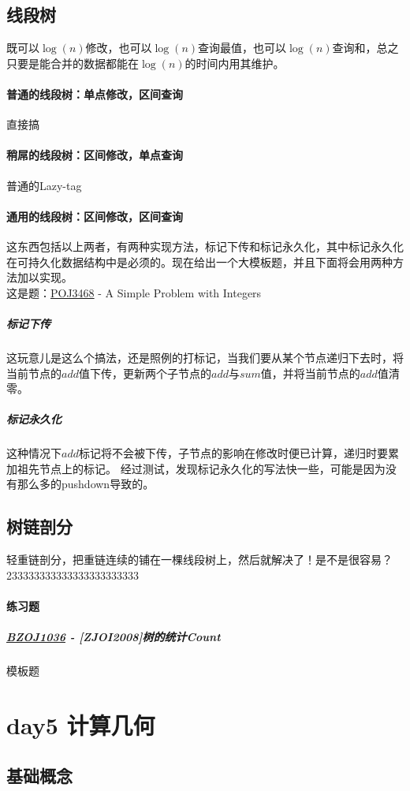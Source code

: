 \documentclass[]{cpp}
\begin{document}
\subsection{线段树} 既可以$\log(n)$修改，也可以$\log(n)$查询最值，也可以$\log(n)$查询和，总之只要是能合并的数据都能在$\log(n)$的时间内用其维护。
\paragraph{普通的线段树：单点修改，区间查询} 直接搞
\paragraph{稍屌的线段树：区间修改，单点查询} 普通的Lazy-tag
\paragraph{通用的线段树：区间修改，区间查询}
	这东西包括以上两者，有两种实现方法，标记下传和标记永久化，其中标记永久化在可持久化数据结构中是必须的。现在给出一个大模板题，并且下面将会用两种方法加以实现。\\
	这是题：\href{http://poj.org/problem?id=3468}{POJ3468} - A Simple Problem with Integers
\subparagraph{标记下传}
	这玩意儿是这么个搞法，还是照例的打标记，当我们要从某个节点递归下去时，将当前节点的$add$值下传，更新两个子节点的$add$与$sum$值，并将当前节点的$add$值清零。
\subparagraph{标记永久化}
	这种情况下$add$标记将不会被下传，子节点的影响在修改时便已计算，递归时要累加祖先节点上的标记。
	经过测试，发现标记永久化的写法快一些，可能是因为没有那么多的pushdown导致的。
\subsection{树链剖分}
	轻重链剖分，把重链连续的铺在一棵线段树上，然后就解决了！是不是很容易？233333333333333333333333
\paragraph{练习题}
\subparagraph{\href{http://www.lydsy.com/JudgeOnline/problem.php?id=1036}{BZOJ1036} - [ZJOI2008]树的统计Count} 模板题
\section{day5 计算几何}
\subsection{基础概念}
\end{document}
